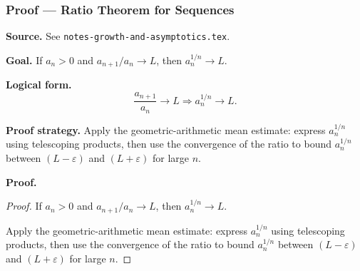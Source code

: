 

\clearpage
{}
\hypertarget{proof-RA-ABB-T-ratio-thm-seq}{}

\subsubsection[Ratio Theorem for Sequences]{Proof --- Ratio Theorem for Sequences}

\bigskip

\noindent
\textbf{Source.} See \texttt{notes-growth-and-asymptotics.tex}.

\vspace{0.75em}

\noindent
\textbf{Goal.} If $a_n > 0$ and $a_{n+1}/a_n \to L$, then $a_n^{1/n} \to L$.

\vspace{0.75em}

\noindent
\textbf{Logical form.}
\[
  \frac{a_{n+1}}{a_n} \to L \Rightarrow a_n^{1/n} \to L.
\]

\vspace{0.75em}

\noindent
\textbf{Proof strategy.} Apply the geometric-arithmetic mean estimate: express $a_n^{1/n}$ using telescoping products, then use the convergence of the ratio to bound $a_n^{1/n}$ between $(L-\varepsilon)$ and $(L+\varepsilon)$ for large $n$.

\vspace{0.75em}

\noindent
\textbf{Proof.}
\begin{proof}
\Claim If $a_n > 0$ and $a_{n+1}/a_n \to L$, then $a_n^{1/n} \to L$.

\Given 

\Goal 

\Strategy Apply the geometric-arithmetic mean estimate: express $a_n^{1/n}$ using telescoping products, then use the convergence of the ratio to bound $a_n^{1/n}$ between $(L-\varepsilon)$ and $(L+\varepsilon)$ for large $n$.

\medskip


\end{proof}

